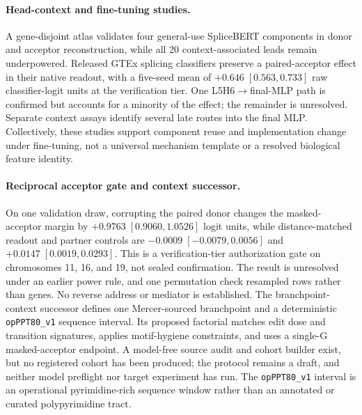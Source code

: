 \documentclass{article}
\begin{document}
\paragraph{Head-context and fine-tuning studies.}
A gene-disjoint atlas validates four general-use SpliceBERT components in donor and acceptor reconstruction, while all 20 context-associated leads remain underpowered. Released GTEx splicing classifiers preserve a paired-acceptor effect in their native readout, with a five-seed mean of \(+0.646\;[0.563,0.733]\) raw classifier-logit units at the verification tier. One L5H6\(\rightarrow\)final-MLP path is confirmed but accounts for a minority of the effect; the remainder is unresolved. Separate context assays identify several late routes into the final MLP. Collectively, these studies support component reuse and implementation change under fine-tuning, not a universal mechanism template or a resolved biological feature identity.

\paragraph{Reciprocal acceptor gate and context successor.}
On one validation draw, corrupting the paired donor changes the masked-acceptor margin by \(+0.9763\;[0.9060,1.0526]\) logit units, while distance-matched readout and partner controls are \(-0.0009\;[-0.0079,0.0056]\) and \(+0.0147\;[0.0019,0.0293]\). This is a verification-tier authorization gate on chromosomes 11, 16, and 19, not sealed confirmation. The result is unresolved under an earlier power rule, and one permutation check resampled rows rather than genes. No reverse address or mediator is established. The branchpoint-context successor defines one Mercer-sourced branchpoint and a deterministic \texttt{opPPT80\_v1} sequence interval. Its proposed factorial matches edit dose and transition signatures, applies motif-hygiene constraints, and uses a single-G masked-acceptor endpoint. A model-free source audit and cohort builder exist, but no registered cohort has been produced; the protocol remains a draft, and neither model preflight nor target experiment has run. The \texttt{opPPT80\_v1} interval is an operational pyrimidine-rich sequence window rather than an annotated or curated polypyrimidine tract.
\end{document}
